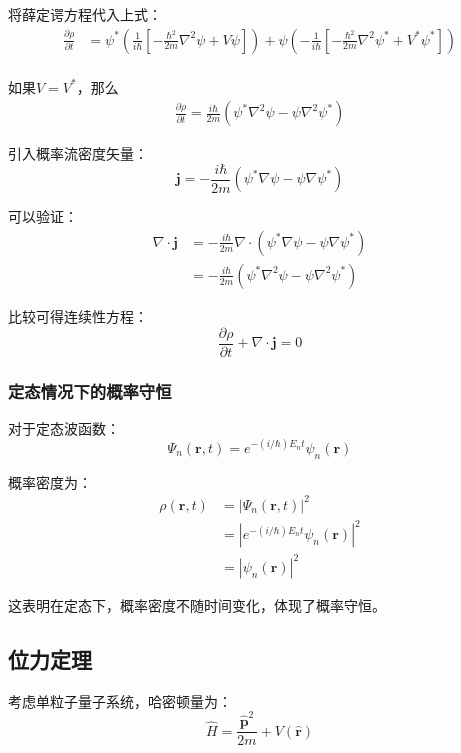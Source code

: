 将薛定谔方程代入上式：
\begin{align}
	\frac{\partial\rho}{\partial t} &= \psi^*\left(\frac{1}{i\hbar}\left[-\frac{\hbar^2}{2m}\nabla^2\psi + V\psi\right]\right) + \psi\left(-\frac{1}{i\hbar}\left[-\frac{\hbar^2}{2m}\nabla^2\psi^* + V^*\psi^*\right]\right) \\	
\end{align}	

如果$V = {V^*}$，那么
\begin{align}
	\frac{\partial\rho}{\partial t} = \frac{i\hbar}{2m}(\psi^*\nabla^2\psi - \psi\nabla^2\psi^*)
\end{align}	

引入概率流密度矢量：
\begin{equation}
	\mathbf{j} = -\frac{i\hbar}{2m}(\psi^*\nabla\psi - \psi\nabla\psi^*)
\end{equation}

可以验证：
\begin{align}
	\nabla\cdot\mathbf{j} &= -\frac{i\hbar}{2m}\nabla\cdot(\psi^*\nabla\psi - \psi\nabla\psi^*) \\
	&= -\frac{i\hbar}{2m}(\psi^*\nabla^2\psi - \psi\nabla^2\psi^*)
\end{align}

比较可得连续性方程：
\begin{equation}
	\frac{\partial\rho}{\partial t} + \nabla\cdot\mathbf{j} = 0
\end{equation}

\subsubsection{定态情况下的概率守恒}

对于定态波函数：
\begin{equation}
	\Psi_n(\mathbf{r}, t) = e^{-(i/\hbar)E_nt}\psi_n(\mathbf{r})
\end{equation}

概率密度为：
\begin{align}
	\rho(\mathbf{r}, t) &= |\Psi_n(\mathbf{r}, t)|^2 \\
	&= |e^{-(i/\hbar)E_nt}\psi_n(\mathbf{r})|^2 \\
	&= |\psi_n(\mathbf{r})|^2
\end{align}

这表明在定态下，概率密度不随时间变化，体现了概率守恒。

\subsection{位力定理}
考虑单粒子量子系统，哈密顿量为：
\[
\hat{H} = \frac{\hat{\mathbf{p}}^2}{2m} + V(\hat{\mathbf{r}})
\]


